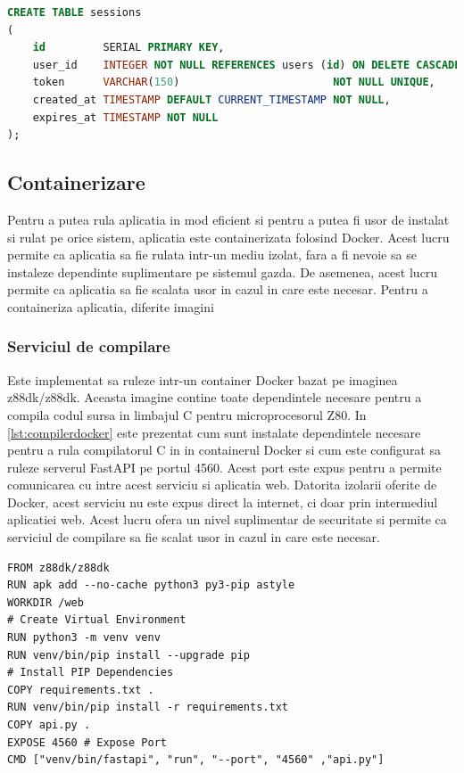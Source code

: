 \documentclass[titlepage,12pt]{article}
\DeclareRobustCommand{\code}[1]{{\ttfamily\small #1}}
\begin{document}
\begin{lstlisting}[language=SQL,caption={Tabelele \code{sessions} din baza de date},label={lst:sessionsdb}]
CREATE TABLE sessions
(
    id         SERIAL PRIMARY KEY,
    user_id    INTEGER NOT NULL REFERENCES users (id) ON DELETE CASCADE,
    token      VARCHAR(150)                        NOT NULL UNIQUE,
    created_at TIMESTAMP DEFAULT CURRENT_TIMESTAMP NOT NULL,
    expires_at TIMESTAMP NOT NULL
);
\end{lstlisting}

\subsection{Containerizare}
Pentru a putea rula aplicatia in mod eficient si pentru a putea fi usor de instalat si rulat pe orice sistem, aplicatia este containerizata folosind Docker. Acest lucru permite ca aplicatia sa fie rulata intr-un mediu izolat, fara a fi nevoie sa se instaleze dependinte suplimentare pe sistemul gazda. De asemenea, acest lucru permite ca aplicatia sa fie scalata usor in cazul in care este necesar.
Pentru a containeriza aplicatia, diferite imagini

\subsubsection{Serviciul de compilare}
Este implementat sa ruleze intr-un container Docker bazat pe imaginea \code {z88dk/z88dk}. Aceasta imagine contine toate dependintele necesare pentru a compila codul sursa in limbajul C pentru microprocesorul Z80.
In \cref{lst:compilerdocker} este prezentat cum sunt instalate dependintele necesare pentru a rula compilatorul C in in containerul Docker si cum este configurat sa ruleze serverul FastAPI pe portul 4560. Acest port este expus pentru a permite comunicarea cu intre acest serviciu si aplicatia web. Datorita izolarii oferite de Docker, acest serviciu nu este expus direct la internet, ci doar prin intermediul aplicatiei web. Acest lucru ofera un nivel suplimentar de securitate si permite ca serviciul de compilare sa fie scalat usor in cazul in care este necesar.

\begin{lstlisting}[language=docker,caption={Dockerfile pentru compilatorul C},label={lst:compilerdocker}]
FROM z88dk/z88dk
RUN apk add --no-cache python3 py3-pip astyle
WORKDIR /web
# Create Virtual Environment
RUN python3 -m venv venv
RUN venv/bin/pip install --upgrade pip
# Install PIP Dependencies
COPY requirements.txt .
RUN venv/bin/pip install -r requirements.txt
COPY api.py .
EXPOSE 4560 # Expose Port
CMD ["venv/bin/fastapi", "run", "--port", "4560" ,"api.py"]
\end{lstlisting}
\end{document}
